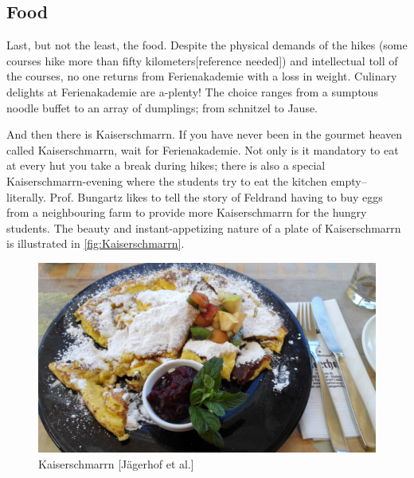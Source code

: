 \subsection{Food}
Last, but not the least, the food. Despite the physical demands of the hikes (some courses hike more than fifty kilometers[reference needed]) and intellectual toll of the courses, no one returns from Ferienakademie with a loss in weight. Culinary delights at Ferienakademie are a-plenty! The choice ranges from a sumptous noodle buffet to an array of dumplings; from schnitzel to Jause. 

And then there is Kaiserschmarrn. If you have never been in the gourmet heaven called Kaiserschmarrn, wait for Ferienakademie. Not only is it mandatory to eat at every hut you take a break during hikes; there is also a special Kaiserschmarrn-evening where the students try to eat the kitchen empty-- literally. Prof. Bungartz likes to tell the story of Feldrand having to buy eggs from a neighbouring farm to provide more Kaiserschmarrn for the hungry students. The beauty and instant-appetizing nature of a plate of Kaiserschmarrn is illustrated in \autoref{fig:Kaiserschmarrn}.
\begin{figure}[ht]%
 	\begin{center}%
 		\includegraphics[scale=0.045]{img/Kaiserschmarrn.jpg}%
 		\caption{Kaiserschmarrn [Jägerhof et al.]}\label{fig:Kaiserschmarrn}%
 	\end{center}%
\end{figure}

